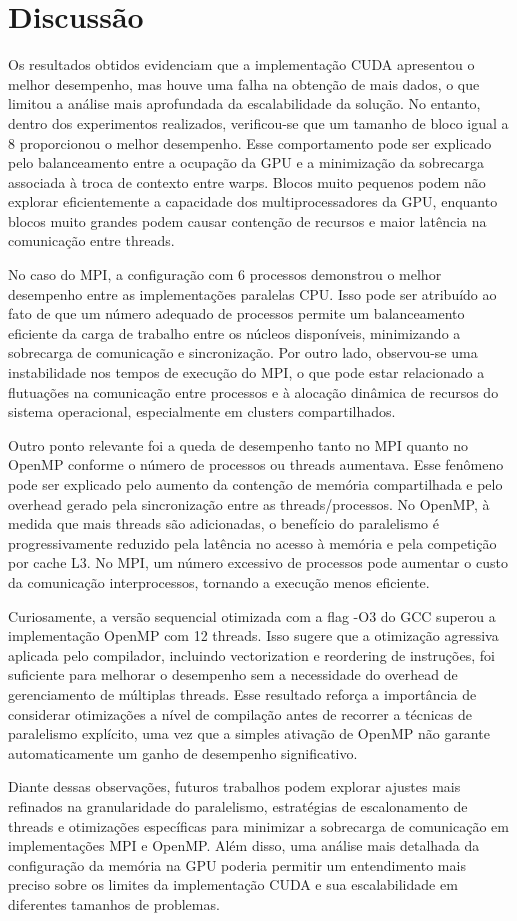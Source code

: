 \section{Discussão}

Os resultados obtidos evidenciam que a implementação CUDA apresentou o melhor desempenho, mas houve uma falha na obtenção de mais dados, o que limitou a análise mais aprofundada da escalabilidade da solução. No entanto, dentro dos experimentos realizados, verificou-se que um tamanho de bloco igual a 8 proporcionou o melhor desempenho. Esse comportamento pode ser explicado pelo balanceamento entre a ocupação da GPU e a minimização da sobrecarga associada à troca de contexto entre warps. Blocos muito pequenos podem não explorar eficientemente a capacidade dos multiprocessadores da GPU, enquanto blocos muito grandes podem causar contenção de recursos e maior latência na comunicação entre threads.

No caso do MPI, a configuração com 6 processos demonstrou o melhor desempenho entre as implementações paralelas CPU. Isso pode ser atribuído ao fato de que um número adequado de processos permite um balanceamento eficiente da carga de trabalho entre os núcleos disponíveis, minimizando a sobrecarga de comunicação e sincronização. Por outro lado, observou-se uma instabilidade nos tempos de execução do MPI, o que pode estar relacionado a flutuações na comunicação entre processos e à alocação dinâmica de recursos do sistema operacional, especialmente em clusters compartilhados.

Outro ponto relevante foi a queda de desempenho tanto no MPI quanto no OpenMP conforme o número de processos ou threads aumentava. Esse fenômeno pode ser explicado pelo aumento da contenção de memória compartilhada e pelo overhead gerado pela sincronização entre as threads/processos. No OpenMP, à medida que mais threads são adicionadas, o benefício do paralelismo é progressivamente reduzido pela latência no acesso à memória e pela competição por cache L3. No MPI, um número excessivo de processos pode aumentar o custo da comunicação interprocessos, tornando a execução menos eficiente.

Curiosamente, a versão sequencial otimizada com a flag -O3 do GCC superou a implementação OpenMP com 12 threads. Isso sugere que a otimização agressiva aplicada pelo compilador, incluindo vectorization e reordering de instruções, foi suficiente para melhorar o desempenho sem a necessidade do overhead de gerenciamento de múltiplas threads. Esse resultado reforça a importância de considerar otimizações a nível de compilação antes de recorrer a técnicas de paralelismo explícito, uma vez que a simples ativação de OpenMP não garante automaticamente um ganho de desempenho significativo.

Diante dessas observações, futuros trabalhos podem explorar ajustes mais refinados na granularidade do paralelismo, estratégias de escalonamento de threads e otimizações específicas para minimizar a sobrecarga de comunicação em implementações MPI e OpenMP. Além disso, uma análise mais detalhada da configuração da memória na GPU poderia permitir um entendimento mais preciso sobre os limites da implementação CUDA e sua escalabilidade em diferentes tamanhos de problemas.